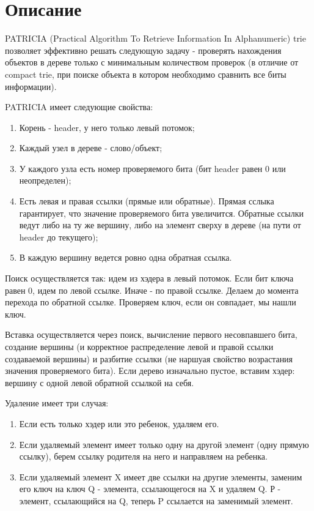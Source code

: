 \section{Описание}
PATRICIA (Practical Algorithm To Retrieve Information In Alphanumeric) trie позволяет эффективно решать следующую задачу - проверять нахождения объектов в дереве только с минимальным количеством проверок (в отличие от compact trie, при поиске объекта в котором необходимо сравнить все биты информации).

PATRICIA имеет следующие свойства:
\begin{enumerate}
	\item Корень - header, у него только левый потомок;
	\item Каждый узел в дереве - слово/объект;
	\item У каждого узла есть номер проверяемого бита (бит header равен 0 или неопределен);
	\item Есть левая и правая ссылки (прямые или обратные). Прямая сслыка гарантирует, что значение проверяемого бита увеличится. Обратные ссылки ведут либо на ту же вершину, либо на элемент сверху в дереве (на пути от header до текущего);
	\item В каждую вершину ведется ровно одна обратная ссылка.
\end{enumerate}

Поиск осуществляется так: идем из хэдера в левый потомок. Если бит ключа равен 0, идем по левой ссылке. Иначе - по правой ссылке. Делаем до момента перехода по обратной ссылке. Проверяем ключ, если он совпадает, мы нашли ключ.

Вставка осуществляется через поиск, вычисление первого несовпавшего бита, создание вершины (и корректное распределение левой и правой ссылки создаваемой вершины) и разбитие ссылки (не наршуая свойство возрастания значения проверяемого бита). Если дерево изначально пустое, вставим хэдер: вершину с одной левой обратной ссылкой на себя.

Удаление имеет три случая:
\begin{enumerate}
	\item Если есть только хэдер или это ребенок, удаляем его.
	\item Если удаляемый элемент имеет только одну на другой элемент (одну прямую ссылку), берем ссылку родителя на него и направляем на ребенка.
	\item Если удаляемый элемент X имеет две ссылки на другие элементы, заменим его ключ на ключ Q - элемента, ссылающегося на X и удаляем Q. Р - элемент, ссылающийся на Q, теперь P ссылается на заменимый элемент.
\end{enumerate}

